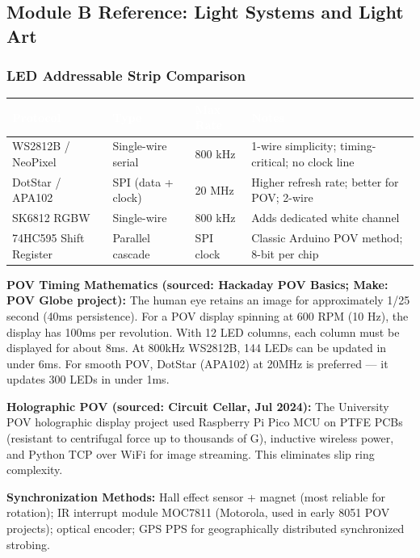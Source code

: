 \documentclass[11pt,letterpaper]{article}
\newcommand{\tableheader}[1]{\textbf{\sffamily\textcolor{white}{#1}}}
\begin{document}
\subsection{Module B Reference: Light Systems and Light Art}

\subsubsection{LED Addressable Strip Comparison}

\begin{center}
\begin{tabularx}{\textwidth}{L{2.5cm}L{2.5cm}L{2cm}X}
\toprule
{}
\tableheader{Protocol} & \tableheader{Type} & \tableheader{Max Rate} & \tableheader{Notes} \\
\midrule
WS2812B / NeoPixel & Single-wire serial & 800 kHz & 1-wire simplicity; timing-critical; no clock line \\
DotStar / APA102 & SPI (data + clock) & 20 MHz & Higher refresh rate; better for POV; 2-wire \\
SK6812 RGBW & Single-wire & 800 kHz & Adds dedicated white channel \\
74HC595 Shift Register & Parallel cascade & SPI clock & Classic Arduino POV method; 8-bit per chip \\
\bottomrule
\end{tabularx}
\end{center}

\textbf{POV Timing Mathematics (sourced: Hackaday POV Basics; Make: POV Globe project):} The human eye retains an image for approximately 1/25 second (40ms persistence). For a POV display spinning at 600 RPM (10 Hz), the display has 100ms per revolution. With 12 LED columns, each column must be displayed for about 8ms. At 800kHz WS2812B, 144 LEDs can be updated in under 6ms. For smooth POV, DotStar (APA102) at 20MHz is preferred --- it updates 300 LEDs in under 1ms.

\textbf{Holographic POV (sourced: Circuit Cellar, Jul 2024):} The University POV holographic display project used Raspberry Pi Pico MCU on PTFE PCBs (resistant to centrifugal force up to thousands of G), inductive wireless power, and Python TCP over WiFi for image streaming. This eliminates slip ring complexity.

\textbf{Synchronization Methods:} Hall effect sensor + magnet (most reliable for rotation); IR interrupt module MOC7811 (Motorola, used in early 8051 POV projects); optical encoder; GPS PPS for geographically distributed synchronized strobing.
\end{document}
